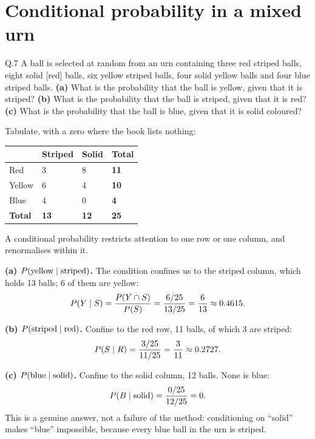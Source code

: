 \section{Conditional probability in a mixed urn}

\begin{question}{Q.7}
A ball is selected at random from an urn containing three red striped balls,
eight solid \textup{[red]} balls, six yellow striped balls, four solid yellow
balls and four blue striped balls.
\textbf{(a)} What is the probability that the ball is yellow, given that it is
striped? \textbf{(b)} What is the probability that the ball is striped, given
that it is red? \textbf{(c)} What is the probability that the ball is blue,
given that it is solid coloured?
\end{question}


\begin{solution}
Tabulate, with a zero where the book lists nothing:

\begin{center}
\small\sffamily
\begin{tabular}{@{}l C{2.2cm} C{2.2cm} C{2.2cm}@{}}
\toprule
 & \textbf{Striped} & \textbf{Solid} & \textbf{Total} \\
\midrule
Red    & 3  & 8 & \textbf{11} \\
Yellow & 6  & 4 & \textbf{10} \\
Blue   & 4  & 0 & \textbf{4} \\
\midrule
\textbf{Total} & \textbf{13} & \textbf{12} & \textbf{25} \\
\bottomrule
\end{tabular}
\end{center}

A conditional probability restricts attention to one row or one column, and
renormalises within it.

\medskip
\textbf{(a) $P\!\left(\text{yellow}\mid\text{striped}\right)$.} The condition confines us
to the striped column, which holds 13 balls; 6 of them are yellow:
\[
P\!\left(Y\mid S\right)=\frac{P\!\left(Y\cap S\right)}{P\!\left(S\right)}
=\frac{6/25}{13/25}=\frac{6}{13}\approx 0.4615 .
\]

\textbf{(b) $P\!\left(\text{striped}\mid\text{red}\right)$.} Confine to the red row, 11
balls, of which 3 are striped:
\[
P\!\left(S\mid R\right)=\frac{3/25}{11/25}=\frac{3}{11}\approx 0.2727 .
\]

\textbf{(c) $P\!\left(\text{blue}\mid\text{solid}\right)$.} Confine to the solid column,
12 balls. None is blue:
\[
P\!\left(B\mid \text{solid}\right)=\frac{0/25}{12/25}=0 .
\]
This is a genuine answer, not a failure of the method: conditioning on ``solid''
makes ``blue'' impossible, because every blue ball in the urn is striped.

\end{solution}

